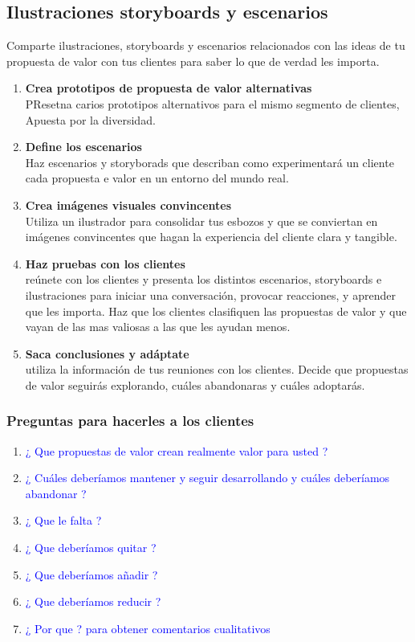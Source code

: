 \documentclass[11pt]{book}
\begin{document}
\subsection{Ilustraciones storyboards y escenarios}
Comparte ilustraciones, storyboards y escenarios relacionados  con las ideas de tu propuesta de valor con tus clientes para saber lo que de verdad les importa.
\begin{enumerate}
\item \textbf{ Crea prototipos de propuesta de valor alternativas }\\
PResetna carios prototipos alternativos para el mismo segmento de clientes, Apuesta por la diversidad. 
\item \textbf{ Define los escenarios }\\
Haz escenarios y storyborads que describan como experimentará un cliente cada propuesta e valor en un entorno del mundo real.
\item \textbf{ Crea imágenes visuales convincentes }\\
Utiliza un ilustrador para consolidar tus esbozos y que se conviertan en imágenes convincentes que hagan la experiencia del cliente clara y tangible.
\item \textbf{ Haz pruebas con los clientes }\\
reúnete con los clientes y presenta los distintos escenarios, storyboards e ilustraciones para iniciar una conversación, provocar reacciones, y aprender que les importa. Haz que los clientes clasifiquen las propuestas de valor y que vayan de las mas valiosas a las que les ayudan menos.
\item \textbf{ Saca conclusiones y adáptate}\\
utiliza la información de tus reuniones con los clientes. Decide que propuestas de valor seguirás explorando, cuáles abandonaras y cuáles adoptarás.
\end{enumerate} 
\subsubsection{Preguntas para hacerles a los clientes}
\begin{enumerate}
\item \textcolor{blue}{¿ Que propuestas de valor crean realmente valor para usted ?}
\item \textcolor{blue}{¿ Cuáles deberíamos mantener y seguir desarrollando y cuáles deberíamos abandonar ?}
\item \textcolor{blue}{¿ Que le falta ?}
\item \textcolor{blue}{¿ Que deberíamos quitar ?}
\item \textcolor{blue}{¿ Que deberíamos añadir ?}
\item \textcolor{blue}{¿ Que deberíamos reducir ?}
\item \textcolor{blue}{¿ Por que ? para obtener comentarios cualitativos}
\end{enumerate}
\end{document}
